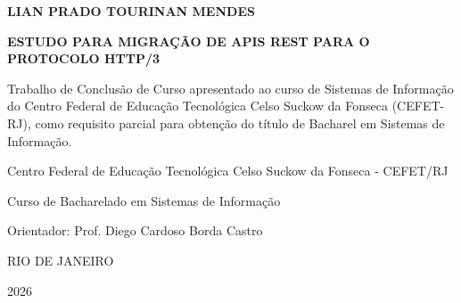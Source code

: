 \begin{titlepage}
\centering
\vspace*{2cm}
{\bfseries\large LIAN PRADO TOURINAN MENDES\par}
\vfill
{\bfseries ESTUDO PARA MIGRAÇÃO DE APIS REST PARA O PROTOCOLO HTTP/3\par}
\vspace{2cm}
\begin{minipage}{0.85\textwidth}
\raggedright
Trabalho de Conclusão de Curso apresentado ao curso de Sistemas de Informação do Centro Federal de Educação Tecnológica Celso Suckow da Fonseca (CEFET-RJ), como requisito parcial para obtenção do título de Bacharel em Sistemas de Informação.
\end{minipage}
\vfill
Centro Federal de Educação Tecnológica Celso Suckow da Fonseca - CEFET/RJ\par
Curso de Bacharelado em Sistemas de Informação\par
\vspace{1.5cm}
Orientador: Prof. Diego Cardoso Borda Castro\par
\vfill
RIO DE JANEIRO\par
2026\par
\end{titlepage}
